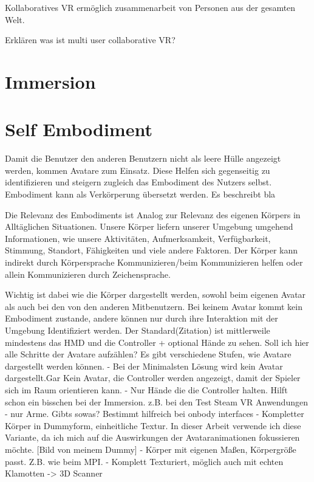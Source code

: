 Kollaboratives VR ermöglich zusammenarbeit von Personen aus der gesamten Welt.

Erklären was ist multi user collaborative VR?

\section{Immersion}

\cite{Boas2012}

\section{Self Embodiment}

Damit die Benutzer den anderen Benutzern nicht als leere Hülle angezeigt werden, kommen Avatare zum Einsatz. Diese Helfen sich gegenseitig zu identifizieren und steigern zugleich das Embodiment des Nutzers selbst. Embodiment kann als Verkörperung übersetzt werden. Es beschreibt bla

Die Relevanz des Embodiments ist Analog zur Relevanz des eigenen Körpers in Alltäglichen Situationen. Unsere Körper liefern unserer Umgebung umgehend Informationen, wie unsere Aktivitäten, Aufmerksamkeit, Verfügbarkeit, Stimmung, Standort, Fähigkeiten und viele andere Faktoren. Der Körper kann indirekt durch Körpersprache Kommunizieren/beim Kommunizieren helfen oder allein Kommunizieren durch Zeichensprache.\cite{Benford2010}

Wichtig ist dabei wie die Körper dargestellt werden, sowohl beim eigenen Avatar als auch bei den von den anderen Mitbenutzern. Bei keinem Avatar kommt kein Embodiment zustande, andere können nur durch ihre Interaktion mit der Umgebung Identifiziert werden. Der Standard(Zitation) ist mittlerweile mindestens das HMD und die Controller + optional Hände zu sehen. \cite{Benford2010}
Soll ich hier alle Schritte der Avatare aufzählen?
Es gibt verschiedene Stufen, wie Avatare dargestellt werden können.
- Bei der Minimalsten Lösung wird kein Avatar dargestellt.Gar Kein Avatar, die Controller werden angezeigt, damit der Spieler sich im Raum orientieren kann.
- Nur Hände die die Controller halten. Hilft schon ein bisschen bei der Immersion. z.B. bei den Test Steam VR Anwendungen
- nur Arme. Gibts sowas? Bestimmt hilfreich bei onbody interfaces
- Kompletter Körper in Dummyform, einheitliche Textur. In dieser Arbeit verwende ich diese Variante, da ich mich auf die Auswirkungen der Avataranimationen fokussieren möchte. 
[Bild von meinem Dummy]
- Körper mit eigenen Maßen, Körpergröße passt. Z.B. wie beim MPI. 
- Komplett Texturiert, möglich auch mit echten Klamotten -> 3D Scanner


